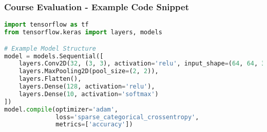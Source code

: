 \documentclass[aspectratio=169]{beamer}
\begin{document}
\begin{frame}[fragile]
    \frametitle{Course Evaluation - Example Code Snippet}
    \begin{lstlisting}[language=Python]
import tensorflow as tf
from tensorflow.keras import layers, models

# Example Model Structure
model = models.Sequential([
    layers.Conv2D(32, (3, 3), activation='relu', input_shape=(64, 64, 3)),
    layers.MaxPooling2D(pool_size=(2, 2)),
    layers.Flatten(),
    layers.Dense(128, activation='relu'),
    layers.Dense(10, activation='softmax')
])
model.compile(optimizer='adam', 
              loss='sparse_categorical_crossentropy', 
              metrics=['accuracy'])
    \end{lstlisting}
\end{frame}
\end{document}
